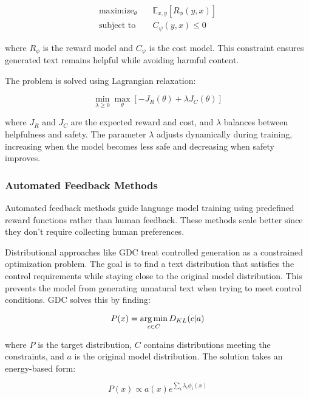 \begin{equation}
\begin{aligned}
    \text{maximize}_\theta & \quad \mathbb{E}_{x,y}[R_\phi(y,x)] \\
    \text{subject to} & \quad C_\psi(y,x) \leq 0
\end{aligned}
\end{equation}

where $R_\phi$ is the reward model and $C_\psi$ is the cost model. This constraint ensures generated text remains helpful while avoiding harmful content.

The problem is solved using Lagrangian relaxation:

\begin{equation}
    \min_{\lambda \geq 0} \max_\theta [-J_R(\theta) + \lambda J_C(\theta)]
\end{equation}

where $J_R$ and $J_C$ are the expected reward and cost, and $\lambda$ balances between helpfulness and safety. The parameter $\lambda$ adjusts dynamically during training, increasing when the model becomes less safe and decreasing when safety improves.

\subsubsection{Automated Feedback Methods}

Automated feedback methods guide language model training using predefined reward functions rather than human feedback. 
These methods scale better since they don't require collecting human preferences. 

Distributional approaches like GDC \cite{khalifa2021distributionalapproachcontrolledtext} treat controlled generation as a constrained optimization problem. 
The goal is to find a text distribution that satisfies the control requirements while staying close to the original model distribution. This prevents the model from generating unnatural text when trying to meet control conditions. 
GDC solves this by finding:

\begin{equation}
P(x) = \operatorname*{arg\,min}_{c \in C} D_{KL}(c | a)
\end{equation}

where $P$ is the target distribution, $C$ contains distributions meeting the constraints, and $a$ is the original model distribution. The solution takes an energy-based form:

\begin{equation}
P(x) \propto a(x) e^{\sum_i \lambda_i \phi_i(x)}
\end{equation}

